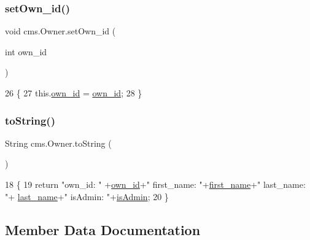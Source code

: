 \subsubsection{\texorpdfstring{set\+Own\+\_\+id()}{setOwn\_id()}}
{\footnotesize\ttfamily void cms.\+Owner.\+set\+Own\+\_\+id (\begin{DoxyParamCaption}\item[{int}]{own\+\_\+id }\end{DoxyParamCaption})\hspace{0.3cm}{\ttfamily [inline]}}


\begin{DoxyCode}
26                                       \{
27         this.\mbox{\hyperlink{classcms_1_1_owner_ae84bad6a2ff834a9f2b3fe6ea23c7192}{own\_id}} = \mbox{\hyperlink{classcms_1_1_owner_ae84bad6a2ff834a9f2b3fe6ea23c7192}{own\_id}};
28     \}
\end{DoxyCode}
\mbox{\label{classcms_1_1_owner_ac6c87a73c65314673d777c86c5f0faac}} 
\subsubsection{\texorpdfstring{to\+String()}{toString()}}
{\footnotesize\ttfamily String cms.\+Owner.\+to\+String (\begin{DoxyParamCaption}{ }\end{DoxyParamCaption})\hspace{0.3cm}{\ttfamily [inline]}}


\begin{DoxyCode}
18                             \{
19         \textcolor{keywordflow}{return}  \textcolor{stringliteral}{"own\_id: "} +\mbox{\hyperlink{classcms_1_1_owner_ae84bad6a2ff834a9f2b3fe6ea23c7192}{own\_id}}+\textcolor{stringliteral}{" first\_name: "}+\mbox{\hyperlink{classcms_1_1_owner_a1cae339c355e6861c6d257004a654b1c}{first\_name}}+\textcolor{stringliteral}{" last\_name: "}+
      \mbox{\hyperlink{classcms_1_1_owner_a0e60226c1b9f367b9fcff9e41adece5e}{last\_name}}+\textcolor{stringliteral}{" isAdmin: "}+\mbox{\hyperlink{classcms_1_1_owner_a0437c5a1a3071521a64846b09c0c6f7e}{isAdmin}};
20     \}
\end{DoxyCode}


\subsection{Member Data Documentation}
\mbox{\label{classcms_1_1_owner_a1cae339c355e6861c6d257004a654b1c}} 
